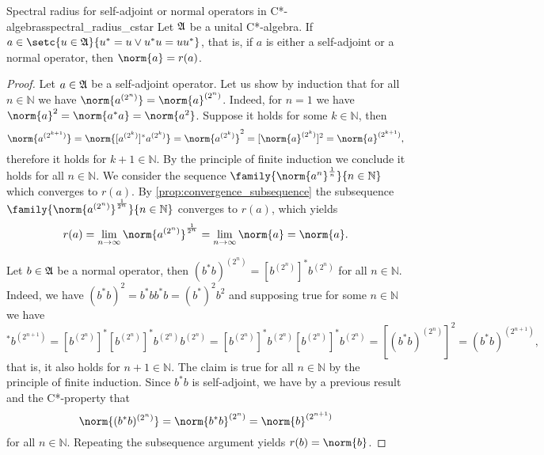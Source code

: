 \begin{theorem}{Spectral radius for self-adjoint or normal operators in C*-algebras}{spectral_radius_cstar}
    Let \(\mathfrak{A}\) be a unital C*-algebra. If \(a \in \setc{u \in \algebra{A}}{u^* = u \lor u^*u = uu^*}\), that is, if \(a\) is either a self-adjoint or a normal operator, then \(\norm{a} = r(a)\).
\end{theorem}
\begin{proof}
    Let \(a \in \mathfrak{A}\) be a self-adjoint operator. Let us show by induction that for all \(n \in \mathbb{N}\) we have \(\norm{a^{(2^n)}} = \norm{a}^{(2^n)}\). Indeed, for \(n = 1\) we have \(\norm{a}^2 = \norm{a^*a} = \norm{a^2}\). Suppose it holds for some \(k \in \mathbb{N}\), then
    \begin{equation*}
        \norm{a^{(2^{k+1})}} = \norm{[a^{(2^k)}]^*a^{(2^k)}}= \norm{a^{(2^k)}}^2 = [\norm{a}^{(2^k)}]^2 = \norm{a}^{(2^{k+1})},
    \end{equation*}
    therefore it holds for \(k + 1 \in \mathbb{N}\). By the principle of finite induction we conclude it holds for all \(n \in \mathbb{N}\). We consider the sequence \(\family{\norm{a^n}^{\frac1n}}{n \in \mathbb{N}}\) which converges to \(r(a)\). By \cref{prop:convergence_subsequence} the subsequence \(\family{\norm{a^{(2^n)}}^{\frac1{2^n}}}{n \in \mathbb{N}}\) converges to \(r(a)\), which yields
    \begin{equation*}
        r(a) = \lim_{n \to \infty}{\norm{a^{(2^n)}}^{\frac1{2^n}}} = \lim_{n\to\infty}{\norm{a}} = \norm{a}.
    \end{equation*}

    Let \(b \in \mathfrak{A}\) be a normal operator, then \((b^*b)^{(2^{n})} = [b^{(2^n)}]^*b^{(2^n)}\) for all \(n \in \mathbb{N}\). Indeed, we have \((b^*b)^2 = b^*bb^*b = (b^*)^2 b^2\) and supposing true for some \(n \in \mathbb{N}\) we have
    \begin{equation*}
        [b^{(2^{n+1})}]^* b^{(2^{n+1})} = [b^{(2^n)}]^* [b^{(2^n)}]^* b^{(2^n)} b^{(2^n)} = [b^{(2^n)}]^*  b^{(2^n)} [b^{(2^n)}]^*b^{(2^n)} = [(b^*b)^{(2^n)}]^2 = (b^*b)^{(2^{n+1})},
    \end{equation*}
    that is, it also holds for \(n + 1 \in \mathbb{N}\). The claim is true for all \(n \in \mathbb{N}\) by the principle of finite induction. Since \(b^*b\) is self-adjoint, we have by a previous result and the C*-property that
    \begin{equation*}
        \norm{(b^*b)^{(2^n)}}= \norm{b^*b}^{(2^n)} = \norm{b}^{(2^{n+1})}
    \end{equation*}
    for all \(n \in \mathbb{N}.\) Repeating the subsequence argument yields \(r(b) = \norm{b}\).
\end{proof}

